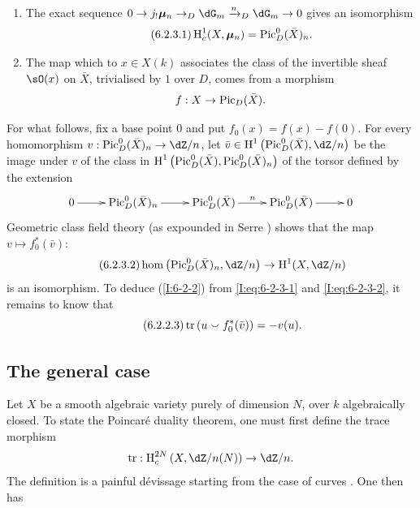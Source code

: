 \begin{enumerate}[\indent a)]
  \item The exact sequence
    $0\to j_!\dmu_n \to _D\dG_m \xrightarrow{n} _D\dG_m\to 0$ gives an
    isomorphism
    \begin{equation*}\tag{6.2.3.1}\label{I:eq:6-2-3-1}
      \operatorname{H}_c^1(X,{\bm\mu}_n) = \operatorname{Pic}_D^0(\bar X)_n \text{.}
    \end{equation*}
  \item The map which to $x\in X(k)$ associates the class of the invertible
    sheaf $\sO(x)$ on $\bar X$, trivialised by $1$ over $D$, comes from
    a morphism
    \[
      f:X \to \operatorname{Pic}_D(\bar X) \text{.}
    \]
\end{enumerate}
For what follows, fix a base point $0$ and put $f_0(x)=f(x)-f(0)$. For
every homomorphism $v:\pic_D^0(\bar X)_n \to \dZ/n$, let
$\bar v\in \h^1\left(\pic_D^0(\bar X),\dZ/n\right)$ be the image under $v$ of
the class in $\operatorname{H}^1\left(\operatorname{Pic}_D^0(\bar X),\operatorname{Pic}_D^0(\bar X)_n\right)$ of the
torsor defined by the extension
\[\xymatrix{
  0 \ar[r]
    & \pic_D^0(\bar X)_n \ar[r]
    & \pic_D^0(\bar X) \ar[r]^-n
    & \pic_D^0(\bar X) \ar[r]
    & 0
}\]
Geometric class field theory (as expounded in
Serre \cite{se59}) shows that the map $v\mapsto f_0^*(\bar v)$:
\begin{equation*}\tag{6.2.3.2}\label{I:eq:6-2-3-2}
  \hom\left(\pic_D^0(\bar X)_n,\dZ/n\right) \to \h^1(X,\dZ/n)
\end{equation*}
is an isomorphism. To deduce (\ref{I:6-2-2}) from \eqref{I:eq:6-2-3-1} and
\eqref{I:eq:6-2-3-2}, it remains to know that
\begin{equation*}\tag{6.2.2.3}\label{I:eq:6-2-3-3}
  \operatorname{tr}\left(u \smallsmile f_0^*(\bar v)\right) = -v(u) \text{.}
\end{equation*}











\subsection{The general case}\label{I:6-3}

Let $X$ be a smooth algebraic variety purely of dimension $N$, over
$k$ algebraically closed. To state the Poincar\'e duality theorem,
one must first define the trace morphism
\[
  \tr : \h_c^{2N}\left(X,\dZ/n(N)\right) \to \dZ/n\text{.}
\]
The definition is a painful d\'evissage starting from the case of curves
\cite[XVIII \S 2]{sga4}. One then has 





